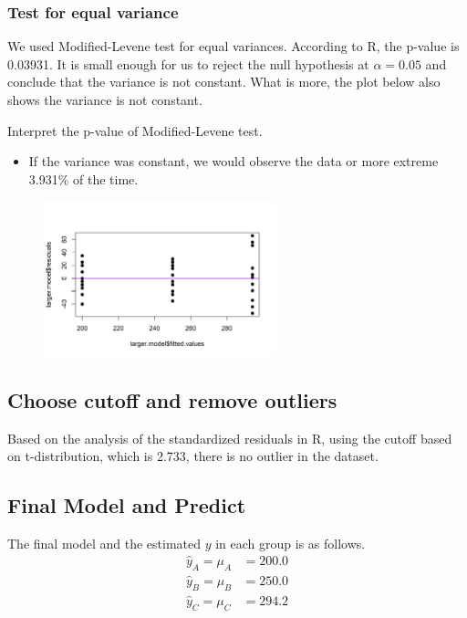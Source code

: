 \documentclass[a4paper,11pt,onecolumn,twoside]{article}
\begin{document}
\subsubsection{Test for equal variance}
We used Modified-Levene test for equal variances. According to R, the p-value is 0.03931. It is small enough for us to reject the null hypothesis at $\alpha=0.05$ and conclude that the variance is not constant. What is more, the plot below also shows the variance is not constant.\par 
Interpret the p-value of Modified-Levene test.
\begin{itemize}
	\item If the variance was constant, we would observe the data or more extreme 3.931\% of the time.
\end{itemize}

\begin{figure}[H]
	\centering
	\includegraphics[width=0.6\textwidth,height=0.3\textheight]{6.png}	
\end{figure}
\subsection{Choose cutoff and remove outliers}
Based on the analysis of the standardized residuals in R, using the cutoff based on t-distribution, which is 2.733, there is no outlier in the dataset.
\subsection{Final Model and Predict}
The final model and the estimated $y$ in each group is as follows.
\begin{equation}
\begin{aligned}
\hat{y}_A=\mu_A&=200.0\\
\hat{y}_B\label{key}=\mu_B&=250.0\\
\hat{y}_C=\mu_C&=294.2\\
\end{aligned}
\end{equation}
\end{document}
